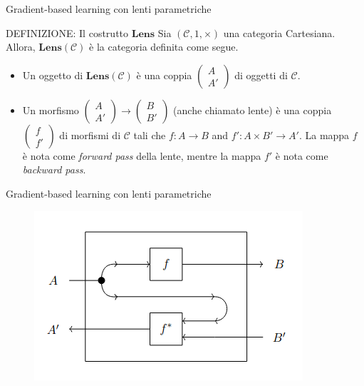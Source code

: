 \documentclass{beamer}
\begin{document}
\begin{frame}{Gradient-based learning con lenti parametriche}
    \begin{block}{DEFINIZIONE: Il costrutto $\mathbf{Lens}$}
        Sia $(\mathcal{C},1,\times)$ una categoria Cartesiana. Allora, $\mathbf{Lens}(\mathcal{C})$ è la categoria definita come segue.
        \begin{itemize}
          \item Un oggetto di $\mathbf{Lens}(\mathcal{C})$ è una coppia $\left(\begin{smallmatrix} A \\ A' \end{smallmatrix}\right)$ di oggetti di $\mathcal{C}$.
          
          \item Un morfismo $\left(\begin{smallmatrix} A \\ A' \end{smallmatrix}\right) \to \left(\begin{smallmatrix} B \\ B' \end{smallmatrix}\right)$ (anche chiamato lente) è una coppia $\left(\begin{smallmatrix} f \\ f' \end{smallmatrix}\right)$ di morfismi di $\mathcal{C}$ tali che $f: A \to B$ and $f': A \times B' \to A'$. La mappa $f$ è nota come \textit{forward pass} della lente, mentre la mappa $f'$ è nota come \textit{backward pass}.
        \end{itemize}
      \end{block}
\end{frame}

\begin{frame}{Gradient-based learning con lenti parametriche}
    \begin{figure}
        \begin{center}
            \includegraphics[width=\textwidth]{figures/lens_inner_view.png}
            \caption*{}
        \end{center}
    \end{figure}
\end{frame}
\end{document}
